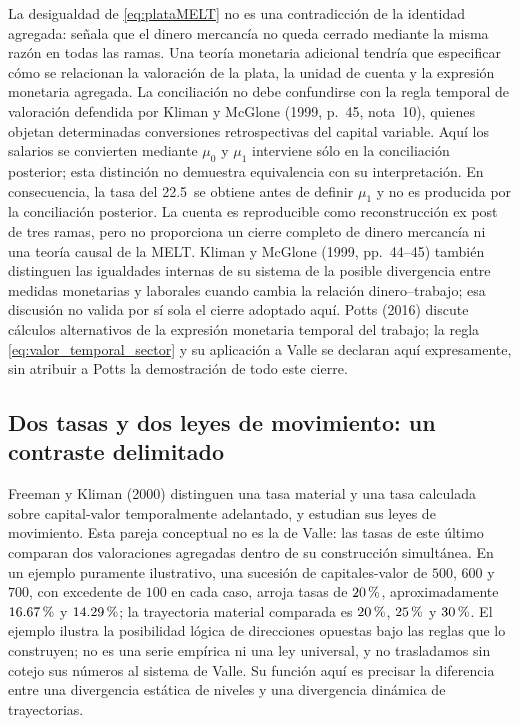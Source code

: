\documentclass[10pt,twoside]{article}
\newcommand{\pct}{\ifmmode\text{\char37}\else\char37\fi}
\begin{document}
La desigualdad de \eqref{eq:plataMELT} no es una contradicción de la identidad agregada: señala que el dinero mercancía no queda cerrado mediante la misma razón en todas las ramas. Una teoría monetaria adicional tendría que especificar cómo se relacionan la valoración de la plata, la unidad de cuenta y la expresión monetaria agregada. La conciliación no debe confundirse con la regla temporal de valoración defendida por Kliman y McGlone (1999, p.~45, nota~10), quienes objetan determinadas conversiones retrospectivas del capital variable. Aquí los salarios se convierten mediante $\mu_0$ y $\mu_1$ interviene sólo en la conciliación posterior; esta distinción no demuestra equivalencia con su interpretación. En consecuencia, la tasa del 22.5\,\pct{} se obtiene antes de definir $\mu_1$ y no es producida por la conciliación posterior. La cuenta es reproducible como reconstrucción ex post de tres ramas, pero no proporciona un cierre completo de dinero mercancía ni una teoría causal de la MELT. Kliman y McGlone (1999, pp.~44--45) también distinguen las igualdades internas de su sistema de la posible divergencia entre medidas monetarias y laborales cuando cambia la relación dinero--trabajo; esa discusión no valida por sí sola el cierre adoptado aquí. Potts (2016) discute cálculos alternativos de la expresión monetaria temporal del trabajo; la regla \eqref{eq:valor_temporal_sector} y su aplicación a Valle se declaran aquí expresamente, sin atribuir a Potts la demostración de todo este cierre.

\subsection*{Dos tasas y dos leyes de movimiento: un contraste delimitado}
Freeman y Kliman (2000) distinguen una tasa material y una tasa calculada sobre capital-valor temporalmente adelantado, y estudian sus leyes de movimiento. Esta pareja conceptual no es la de Valle: las tasas de este último comparan dos valoraciones agregadas dentro de su construcción simultánea. En un ejemplo puramente ilustrativo, una sucesión de capitales-valor de $500$, $600$ y $700$, con excedente de $100$ en cada caso, arroja tasas de $20\,\pct$, aproximadamente $16.67\,\pct$ y $14.29\,\pct$; la trayectoria material comparada es $20\,\pct$, $25\,\pct$ y $30\,\pct$. El ejemplo ilustra la posibilidad lógica de direcciones opuestas bajo las reglas que lo construyen; no es una serie empírica ni una ley universal, y no trasladamos sin cotejo sus números al sistema de Valle. Su función aquí es precisar la diferencia entre una divergencia estática de niveles y una divergencia dinámica de trayectorias.
\end{document}
